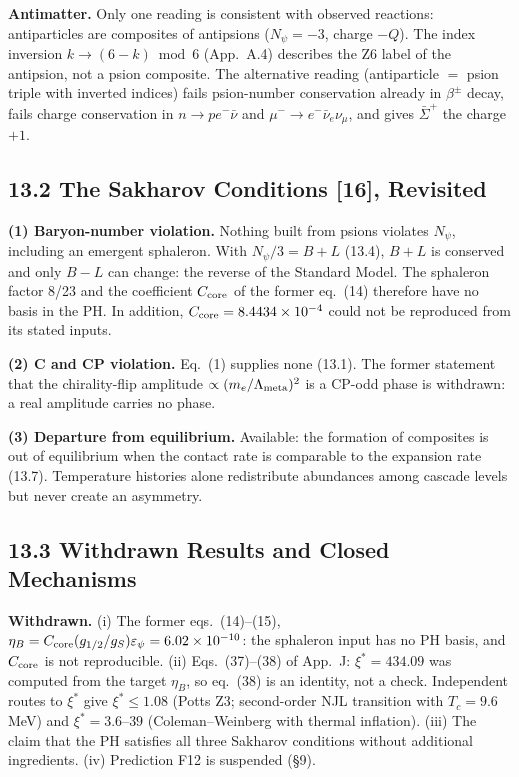 \noindent \textbf{Antimatter. }Only one reading is consistent with observed reactions: antiparticles are composites of antipsions ($N_\psi=-3$, charge $-Q$). The index inversion $k\to(6-k)\bmod 6$ (App.~A.4) describes the Z6 label of the antipsion, not a psion composite. The alternative reading (antiparticle $=$ psion triple with inverted indices) fails psion-number conservation already in $\beta^\pm$ decay, fails charge conservation in $n\to pe^-\bar\nu$ and $\mu^-\to e^-\bar\nu_e\nu_\mu$, and gives $\bar\Sigma^+$ the charge $+1$.

\subsection*{13.2  The Sakharov Conditions [16], Revisited}

\noindent \textbf{(1) Baryon-number violation. }Nothing built from psions violates $N_\psi$, including an emergent sphaleron. With $N_\psi/3=B+L$ (13.4), $B+L$ is conserved and only $B-L$ can change: the reverse of the Standard Model. The sphaleron factor 8/23 and the coefficient $C_{\rm core}$ of the former eq.~(14) therefore have no basis in the PH. In addition, $C_{\rm core}=8.4434\times10^{-4}$ could not be reproduced from its stated inputs.

\noindent \textbf{(2) C and CP violation. }Eq.~(1) supplies none (13.1). The former statement that the chirality-flip amplitude $\propto(m_e/\Lambda_{\rm meta})^2$ is a CP-odd phase is withdrawn: a real amplitude carries no phase.

\noindent \textbf{(3) Departure from equilibrium. }Available: the formation of composites is out of equilibrium when the contact rate is comparable to the expansion rate (13.7). Temperature histories alone redistribute abundances among cascade levels but never create an asymmetry.

\subsection*{13.3  Withdrawn Results and Closed Mechanisms}

\noindent \textbf{Withdrawn. }(i) The former eqs.~(14)--(15), $\eta_B = C_{\rm core}(g_{1/2}/g_S)\varepsilon_\psi = 6.02\times10^{-10}$: the sphaleron input has no PH basis, and $C_{\rm core}$ is not reproducible. (ii) Eqs.~(37)--(38) of App.~J: $\xi^*=434.09$ was computed from the target $\eta_B$, so eq.~(38) is an identity, not a check. Independent routes to $\xi^*$ give $\xi^*\le1.08$ (Potts Z3; second-order NJL transition with $T_c=9.6$ MeV) and $\xi^*=3.6$--$39$ (Coleman--Weinberg with thermal inflation). (iii) The claim that the PH satisfies all three Sakharov conditions without additional ingredients. (iv) Prediction F12 is suspended (§9).

